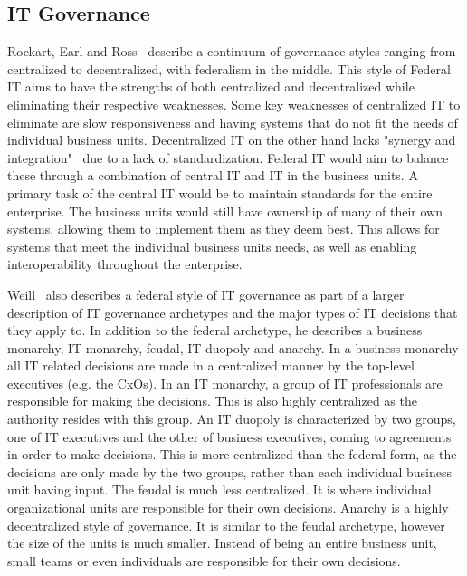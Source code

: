 \subsection{IT Governance}

Rockart, Earl and Ross~\cite{Rockart1996} describe a continuum of governance styles ranging from centralized to decentralized, with federalism in the middle. This style of Federal IT aims to have the strengths of both centralized and decentralized while eliminating their respective weaknesses. Some key weaknesses of centralized IT to eliminate are slow responsiveness and having systems that do not fit the needs of individual business units. Decentralized IT on the other hand lacks "synergy and integration"~\cite{Rockart1996} due to a lack of standardization. Federal IT would aim to balance these through a combination of central IT and IT in the business units. A primary task of the central IT would be to maintain standards for the entire enterprise. The business units would still have ownership of many of their own systems, allowing them to implement them as they deem best. This allows for systems that meet the individual business units needs, as well as enabling interoperability throughout the enterprise. 

Weill~\cite{Weill2004} also describes a federal style of IT governance as part of a larger description of IT governance archetypes and the major types of IT decisions that they apply to. In addition to the federal archetype, he describes a business monarchy, IT monarchy, feudal, IT duopoly and anarchy. In a business monarchy all IT related decisions are made in a centralized manner by the top-level executives (e.g. the CxOs). In an IT monarchy, a group of IT professionals are responsible for making the decisions. This is also highly centralized as the authority resides with this group. An IT duopoly is characterized by two groups, one of IT executives and the other of business executives, coming to agreements in order to make decisions. This is more centralized than the federal form, as the decisions are only made by the two groups, rather than each individual business unit having input. The feudal is much less centralized. It is where individual organizational units are responsible for their own decisions. Anarchy is a highly decentralized style of governance. It is similar to the feudal archetype, however the size of the units is much smaller. Instead of being an entire business unit, small teams or even individuals are responsible for their own decisions.

